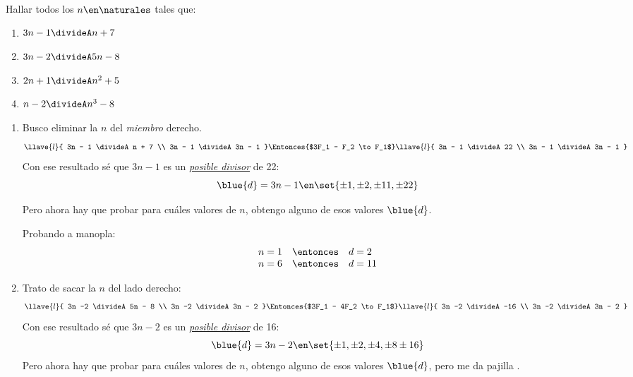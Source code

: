 \def\enumeracion{\alph*)}
\begin{enunciado}{\ejercicio}
  Hallar todos los $n \en \naturales$ tales que:
  \begin{multicols}{2}
    \begin{enumerate}[label=\enumeracion]
      \item $3n - 1 \divideA n+7$
      \item $3n -2 \divideA 5n - 8$
      \item $2n+1 \divideA n^2 + 5$
      \item $n-2 \divideA n^3 - 8$
    \end{enumerate}
  \end{multicols}
\end{enunciado}

\begin{enumerate}[label=\enumeracion]
  \item
        Busco eliminar la $n$ del \textit{miembro} derecho.
        $$
          \llave{l}{
            3n - 1 \divideA n + 7 \\
            3n - 1 \divideA 3n - 1
          }
          \Entonces{$3F_1 - F_2 \to F_1$}
          \llave{l}{
            3n - 1 \divideA 22 \\
            3n - 1 \divideA 3n - 1
          }
        $$
        Con ese resultado sé que $3n -1$ es un \textit{\underline{posible divisor}} de 22:
        $$
          \blue{d} = 3n - 1 \en \set{\pm1,\pm2, \pm11, \pm22}
        $$

        Pero ahora hay que probar para cuáles valores de $n$, obtengo alguno de esos valores $\blue{d}$.

        Probando a manopla:
        $$
          \begin{array}{lcl}
            n = 1 & \entonces & d = 2  \\
            n = 6 & \entonces & d = 11
          \end{array}
        $$

  \item Trato de sacar la $n$ del lado derecho:
        $$
          \llave{l}{
            3n -2 \divideA 5n - 8 \\
            3n -2 \divideA 3n - 2
          }
          \Entonces{$3F_1 - 4F_2 \to F_1$}
          \llave{l}{
            3n -2 \divideA -16 \\
            3n -2 \divideA 3n - 2
          }
        $$
        Con ese resultado sé que $3n -2$ es un \textit{\underline{posible divisor}} de  16:
        $$
          \blue{d} = 3n - 2 \en \set{\pm1, \pm2, \pm4, \pm8 \pm 16}
        $$
        Pero ahora hay que probar para cuáles valores de $n$, obtengo alguno de esos valores $\blue{d}$,
        pero me da pajilla .


\end{enumerate}
